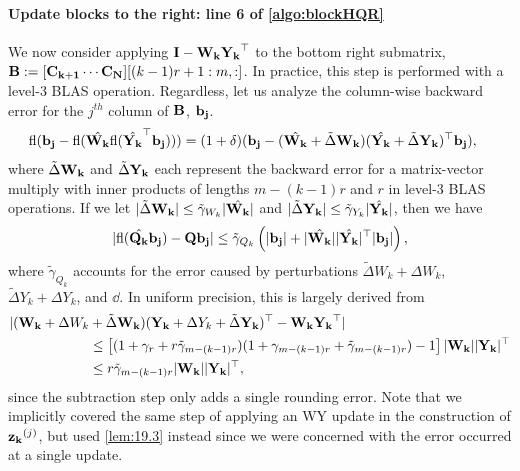 \paragraph{Update blocks to the right: line 6 of \cref{algo:blockHQR}}
We now consider applying $\mathbf{I}-\mathbf{W_kY_k}^{\top}$ to the bottom right submatrix, $\mathbf{B}:=[\mathbf{C_{k+1}}\cdots \mathbf{C_N}][(k-1)r+1:m,:]$.
In practice, this step is performed with a level-3 BLAS operation. 
Regardless, let us analyze the column-wise backward error for the $j^{th}$ column of $\mathbf{B}$, $\mathbf{b_j}$.
\begin{align*}
	\mathrm{fl}(\mathbf{b_j} - \mathrm{fl}(\hat{\mathbf{W_k}}\mathrm{fl}(\hat{\mathbf{Y_k}}^{\top}\mathbf{b_j}))) & =(1+\delta)(\mathbf{b_j} - (\hat{\mathbf{W_k}} + \tilde{\Delta} \mathbf{W_k}) (\hat{\mathbf{Y_k}} + \tilde{\Delta} \mathbf{Y_k})^{\top}\mathbf{b_j}),
\end{align*}
where $\tilde{\Delta} \mathbf{W_k}$ and $\tilde{\Delta} \mathbf{Y_k}$ each represent the backward error for a matrix-vector multiply with inner products of lengths $m-(k-1)r$ and $r$ in level-3 BLAS operations.
If we let $|\tilde{\Delta} \mathbf{W_k}| \leq \tilde{\gamma}_{W_k}|\hat{\mathbf{W_k}}|$ and $|\tilde{\Delta} \mathbf{Y_k}| \leq \tilde{\gamma}_{Y_k}|\hat{\mathbf{Y_k}}|$, then we have 
\begin{equation*}
	|\mathrm{fl}(\hat{\mathbf{Q_k}}\mathbf{b_j}) - \mathbf{Qb_j}| \leq \tilde{\gamma}_{Q_k} \left(|\mathbf{b_j}|+|\hat{\mathbf{W_k}}||\hat{\mathbf{Y_k}}|^{\top}|\mathbf{b_j}|\right),
\end{equation*}
where $\tilde{\gamma}_{Q_k}$ accounts for the error caused by perturbations $\tilde{\Delta}{W_k}+\Delta{W_k}$, $\tilde{\Delta}{Y_k} + \Delta{Y_k}$, and $\dd$.
In uniform precision, this is largely derived from 
\begin{align*}
	|(\mathbf{W_k} +\Delta{W_k} &+ \tilde{\Delta} \mathbf{W_k}) (\mathbf{Y_k} + \Delta{Y_k} + \tilde{\Delta} \mathbf{Y_k})^{\top} - \mathbf{W_k} \mathbf{Y_k}^{\top}| \\
	 &\leq \left[(1+ \gamma_{r}+r\tilde{\gamma}_{m-(k-1)r})(1+ \gamma_{m-(k-1)r} + \tilde{\gamma}_{m-(k-1)r})-1\right]|\mathbf{W_k}||\mathbf{Y_k}|^{\top} \\ 
	 &\leq r\tilde{\gamma}_{m-(k-1)r}|\mathbf{W_k}||\mathbf{Y_k}|^{\top},
\end{align*}
since the subtraction step only adds a single rounding error. 
Note that we implicitly covered the same step of applying an WY update in the construction of $\mathbf{z_k}^{(j)}$, but used \cref{lem:19.3} instead since we were concerned with the error occurred at a single update. 
